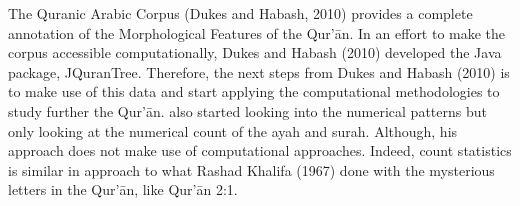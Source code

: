 The Quranic Arabic Corpus (Dukes and Habash, 2010) provides a complete annotation of the Morphological Features of the Qur'\=an. In an effort to make the corpus accessible computationally, Dukes and Habash (2010) developed the Java package, JQuranTree. Therefore, the next steps from Dukes and Habash (2010) is to make use of this data and start applying the computational methodologies to study further the Qur'\=an. \cite{sinai2017} also started looking into the numerical patterns but only looking at the numerical count of the ayah and surah. Although, his approach does not make use of computational approaches. Indeed, \cite{sinai2017} count statistics is similar in approach to what Rashad Khalifa (1967) done with the mysterious letters in the Qur'\=an, like Qur'\=an 2:1. 

